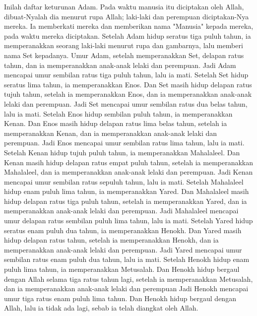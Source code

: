 \begin{biblechapter} %
 Inilah daftar keturunan Adam. Pada waktu manusia itu diciptakan oleh Allah, dibuat-Nyalah dia menurut rupa Allah;
\verse laki-laki dan perempuan diciptakan-Nya mereka. Ia memberkati mereka dan memberikan nama "Manusia" kepada mereka, pada waktu mereka diciptakan.
\verse Setelah Adam hidup seratus tiga puluh tahun, ia memperanakkan seorang laki-laki menurut rupa dan gambarnya, lalu memberi nama Set kepadanya.
\verse Umur Adam, setelah memperanakkan Set, delapan ratus tahun, dan ia memperanakkan anak-anak lelaki dan perempuan.
\verse Jadi Adam mencapai umur sembilan ratus tiga puluh tahun, lalu ia mati.
\verse Setelah Set hidup seratus lima tahun, ia memperanakkan Enos.
\verse Dan Set masih hidup delapan ratus tujuh tahun, setelah ia memperanakkan Enos, dan ia memperanakkan anak-anak lelaki dan perempuan.
\verse Jadi Set mencapai umur sembilan ratus dua belas tahun, lalu ia mati.
\verse Setelah Enos hidup sembilan puluh tahun, ia memperanakkan Kenan.
\verse Dan Enos masih hidup delapan ratus lima belas tahun, setelah ia memperanakkan Kenan, dan ia memperanakkan anak-anak lelaki dan perempuan.
\verse Jadi Enos mencapai umur sembilan ratus lima tahun, lalu ia mati.
\verse Setelah Kenan hidup tujuh puluh tahun, ia memperanakkan Mahalaleel.
\verse Dan Kenan masih hidup delapan ratus empat puluh tahun, setelah ia memperanakkan Mahalaleel, dan ia memperanakkan anak-anak lelaki dan perempuan.
\verse Jadi Kenan mencapai umur sembilan ratus sepuluh tahun, lalu ia mati.
\verse Setelah Mahalaleel hidup enam puluh lima tahun, ia memperanakkan Yared.
\verse Dan Mahalaleel masih hidup delapan ratus tiga puluh tahun, setelah ia memperanakkan Yared, dan ia memperanakkan anak-anak lelaki dan perempuan.
\verse Jadi Mahalaleel mencapai umur delapan ratus sembilan puluh lima tahun, lalu ia mati.
\verse Setelah Yared hidup seratus enam puluh dua tahun, ia memperanakkan Henokh.
\verse Dan Yared masih hidup delapan ratus tahun, setelah ia memperanakkan Henokh, dan ia memperanakkan anak-anak lelaki dan perempuan.
\verse Jadi Yared mencapai umur sembilan ratus enam puluh dua tahun, lalu ia mati.
\verse Setelah Henokh hidup enam puluh lima tahun, ia memperanakkan Metusalah.
\verse Dan Henokh hidup bergaul dengan Allah selama tiga ratus tahun lagi, setelah ia memperanakkan Metusalah, dan ia memperanakkan anak-anak lelaki dan perempuan
\verse Jadi Henokh mencapai umur tiga ratus enam puluh lima tahun.
\verse Dan Henokh hidup bergaul dengan Allah, lalu ia tidak ada lagi, sebab ia telah diangkat oleh Allah.

\end{biblechapter}
